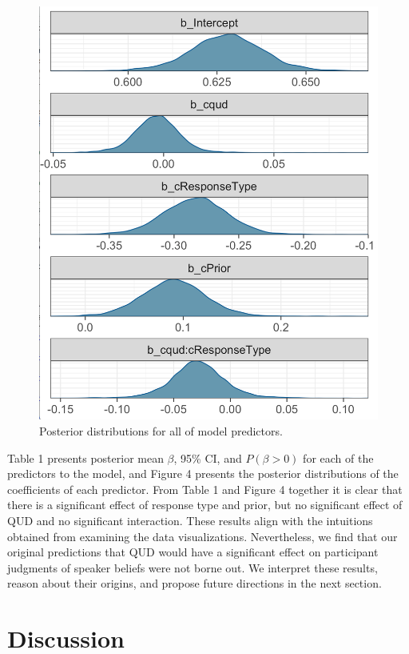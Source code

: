 \documentclass[11pt,a4paper]{article}
\begin{document}
\begin{figure}[h]
\includegraphics[width=\linewidth]{beta.png}
\caption{Posterior distributions for all \betas of model predictors.}
\label{nounclass}
\end{figure}


Table 1 presents posterior mean $\beta$, 95\% CI, and $P(\beta > 0)$ for each of the predictors to the model, and Figure 4 presents the posterior distributions of the coefficients of each predictor. From Table 1 and Figure 4 together it is clear that there is a significant effect of response type and prior, but no significant effect of QUD and no significant interaction. These results align with the intuitions obtained from examining the data visualizations. Nevertheless, we find that our original predictions that QUD would have a significant effect on participant judgments of speaker beliefs were not borne out. We interpret these results, reason about their origins, and propose future directions in the next section. 

\section{Discussion}
\end{document}
